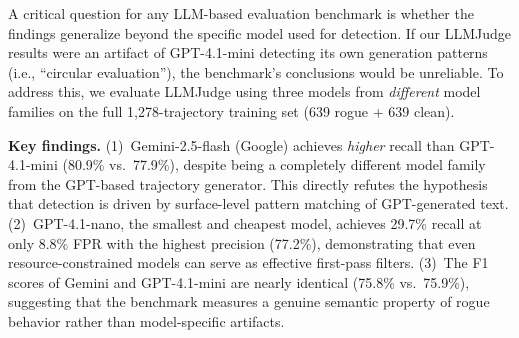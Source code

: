 \documentclass{article}
\begin{document}
A critical question for any LLM-based evaluation benchmark is whether the findings generalize beyond the specific model used for detection. If our LLMJudge results were an artifact of GPT-4.1-mini detecting its own generation patterns (i.e., ``circular evaluation''), the benchmark's conclusions would be unreliable. To address this, we evaluate LLMJudge using three models from \emph{different} model families on the full 1,278-trajectory training set (639 rogue + 639 clean).

\begin{table}[h]
\caption{Cross-model detector generalization. LLMJudge evaluated on the 1,278 \emph{training} trajectories using three model families. All runs use temperature=0; the 77.9\% GPT-4.1-mini recall here vs.\ 91.2\% in Table~\ref{tab:paraphrase} reflects run-to-run LLM non-determinism across separate API sessions (see text).}
\label{tab:cross_model}
\vskip 0.15in
\begin{center}
\begin{small}
\begin{sc}
\end{sc}
\end{small}
\end{center}
\vskip -0.1in
\end{table}

\textbf{Key findings.} (1)~Gemini-2.5-flash (Google) achieves \emph{higher} recall than GPT-4.1-mini (80.9\% vs.\ 77.9\%), despite being a completely different model family from the GPT-based trajectory generator. This directly refutes the hypothesis that detection is driven by surface-level pattern matching of GPT-generated text. (2)~GPT-4.1-nano, the smallest and cheapest model, achieves 29.7\% recall at only 8.8\% FPR with the highest precision (77.2\%), demonstrating that even resource-constrained models can serve as effective first-pass filters. (3)~The F1 scores of Gemini and GPT-4.1-mini are nearly identical (75.8\% vs.\ 75.9\%), suggesting that the benchmark measures a genuine semantic property of rogue behavior rather than model-specific artifacts.
\end{document}
